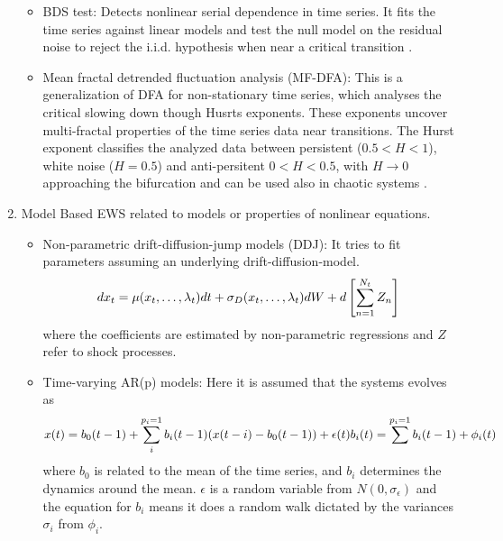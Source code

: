 \begin{enumerate}
\begin{itemize}
	\item BDS test: Detects nonlinear serial dependence in time series. It fits the time series against linear models and test the null model on the residual noise to reject the i.i.d. hypothesis when near a critical transition \citep{Carpenter2011}.
	\item Mean fractal detrended fluctuation analysis (MF-DFA): This is a generalization of DFA for non-stationary time series, which analyses the critical slowing down though Husrts exponents. These exponents uncover multi-fractal properties of the time series data near transitions. 
	The Hurst exponent classifies the analyzed data between persistent ($0.5<H<1$), white noise ($H=0.5$) and anti-persitent $0<H<0.5$, with $H\rightarrow 0$ approaching the bifurcation and can be used also in chaotic systems \citep{Kaur2022,Bury2020,Pavithran2021}.
	
\end{itemize}


\item{Model Based}
EWS related to models or properties of nonlinear equations.

\begin{itemize}
	\item Non-parametric drift-diffusion-jump models (DDJ): It tries to fit parameters assuming an underlying drift-diffusion-model.
	\[
	dx_t=\mu(x_t,\dots,\lambda_t)dt+\sigma_D(x_t,\dots,\lambda_t)dW+d\left[ \sum_{n=1}^{N_t} Z_n\right] 
	\]
	where the coefficients are estimated by non-parametric regressions \citep{Ahn1988,Bandi2003,Carpenter2011a} and $Z$ refer to shock processes.
	\item Time-varying AR(p) models: 
	Here it is assumed that the systems evolves as 
	\begin{equation}
		x(t)=b_0(t-1)+\sum^{p_i=1}_i b_i(t-1)(x(t-i)-b_0(t-1))+\epsilon(t)\\
		b_i(t)=\sum^{p_i=1} b_i(t-1)+\phi_i(t)
	\end{equation}
where $b_0$ is related to the mean of the time series, and $b_i$ determines the dynamics around the mean.   $\epsilon$ is a random variable from $N(0,\sigma_\epsilon)$ and the equation for $b_i$ means it does a random walk dictated by the variances $\sigma_i$ from $\phi_i$.


\end{itemize}
\end{enumerate}
